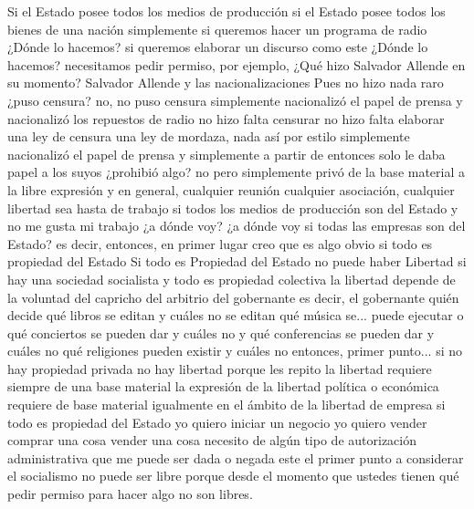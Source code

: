 Si el Estado posee todos los medios de producción si el Estado posee todos los bienes de una nación simplemente si queremos hacer un programa de radio ¿Dónde lo hacemos? si queremos elaborar un discurso como este ¿Dónde lo hacemos? necesitamos pedir permiso, por ejemplo, ¿Qué hizo Salvador Allende en su momento? Salvador Allende y las nacionalizaciones Pues no hizo nada raro ¿puso censura? no, no puso censura simplemente nacionalizó el papel de prensa
y nacionalizó los repuestos de radio no hizo falta censurar no hizo falta elaborar una ley de censura
una ley de mordaza, nada así por estilo simplemente nacionalizó el papel de prensa y simplemente a partir de entonces
solo le daba papel a los suyos ¿prohibió algo? no pero simplemente privó de la base material
a la libre expresión y en general, cualquier reunión cualquier asociación, cualquier libertad sea hasta de trabajo
si todos los medios de producción son del Estado y no me gusta mi trabajo ¿a dónde voy?
¿a dónde voy si todas las empresas son del Estado? es decir, entonces, en primer lugar creo que es algo obvio si todo es propiedad del Estado
Si todo es Propiedad del Estado no puede haber Libertad
si hay una sociedad socialista y todo es propiedad colectiva la libertad depende de la voluntad del capricho
del arbitrio del gobernante es decir, el gobernante quién decide qué libros se editan y cuáles no se editan
qué música se... puede ejecutar o qué conciertos se pueden dar y cuáles no y qué conferencias se pueden dar y cuáles no
qué religiones pueden existir y cuáles no entonces, primer punto... si no hay propiedad privada no hay libertad
porque les repito la libertad requiere siempre de una base material la expresión de la libertad
política o económica requiere de base material igualmente en el ámbito de la libertad de empresa
si todo es propiedad del Estado yo quiero iniciar un negocio yo quiero vender comprar una cosa vender una cosa necesito de algún tipo de autorización administrativa
que me puede ser dada o negada este el primer punto a considerar el socialismo no puede ser libre
porque desde el momento que ustedes tienen qué pedir permiso para hacer algo no son libres.


